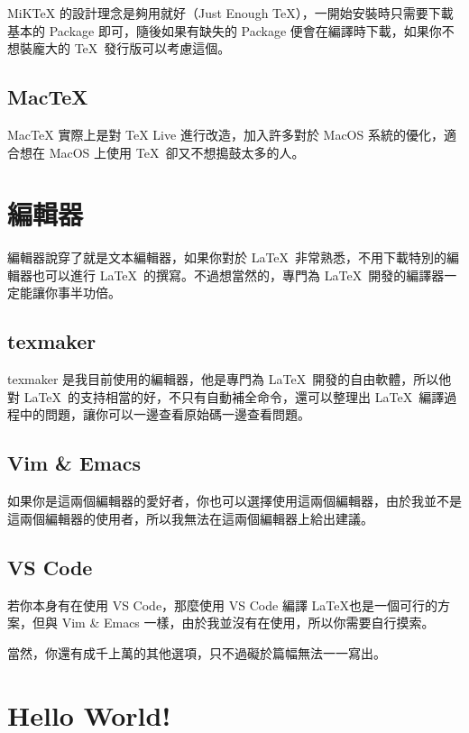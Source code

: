MiKTeX 的設計理念是夠用就好（Just Enough \TeX ），一開始安裝時只需要下載基本的 Package 即可，隨後如果有缺失的 Package 便會在編譯時下載，如果你不想裝龐大的 \TeX\ 發行版可以考慮這個。

\subsection{MacTeX}

MacTeX 實際上是對 TeX Live 進行改造，加入許多對於 MacOS 系統的優化，適合想在 MacOS 上使用 \TeX\ 卻又不想搗鼓太多的人。

\section{編輯器}

編輯器說穿了就是文本編輯器，如果你對於 \LaTeX\ 非常熟悉，不用下載特別的編輯器也可以進行 \LaTeX\ 的撰寫。不過想當然的，專門為 \LaTeX\ 開發的編譯器一定能讓你事半功倍。

\subsection{texmaker}

texmaker 是我目前使用的編輯器，他是專門為 \LaTeX\ 開發的自由軟體，所以他對 \LaTeX\ 的支持相當的好，不只有自動補全命令，還可以整理出 \LaTeX\ 編譯過程中的問題，讓你可以一邊查看原始碼一邊查看問題。

\subsection{Vim \& Emacs}

如果你是這兩個編輯器的愛好者，你也可以選擇使用這兩個編輯器，由於我並不是這兩個編輯器的使用者，所以我無法在這兩個編輯器上給出建議。

\subsection{VS Code}

若你本身有在使用 VS Code，那麼使用 VS Code 編譯 \LaTeX 也是一個可行的方案，但與 Vim \& Emacs 一樣，由於我並沒有在使用，所以你需要自行摸索。

當然，你還有成千上萬的其他選項，只不過礙於篇幅無法一一寫出。

\section{Hello World!}

